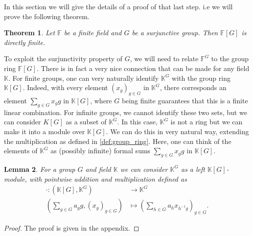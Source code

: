 \documentclass[titlepage, a4paper]{article}
\newcommand{\F}{\mathbb{F}}
\newtheorem{theorem}{Theorem}[section]
\newtheorem{lemma}[theorem]{Lemma}
\theoremstyle{remark}
\newtheorem{remark}[theorem]{Remark}
\begin{document}
	In this section we will give the details of a proof of that last step. 
	i.e we will prove the following theorem. 
	\begin{theorem}\label{thm:gottschalk_kaplansky}
		Let $\F$ be a finite field and $G$ be a surjunctive group. Then $\F[G]$ is directly finite. 
	\end{theorem}
	To exploit the surjunctivity property of $G$, we will need to relate $\mathbb F^G$ to the group ring $\mathbb F[G]$. There is in fact a very nice connection that can be made for any field $\mathbb K$.
	For finite groups, one can very naturally identify $\mathbb K^G$ with the group ring $\mathbb K[G]$. Indeed, with every element $(x_g)_{g \in G}$ in $\mathbb K^G$, there corresponds an element $\sum_{g \in G} x_g g$ in $\mathbb K[G]$, where $G$ being finite guarantees that this is a finite linear combination. For infinite groups, we cannot identify these two sets, but we can consider $K[G]$ as a subset of $\mathbb K^G$. In this case, $\mathbb K^G$ is not a ring but we can make it into a module over $\mathbb K[G]$. We can do this in very natural way, extending the multiplication as defined in \cref{def:group_ring}. Here, one can think of the elements of $\mathbb K^G$ as (possibly infinite) formal sums $\sum_{g \in G} x_g g$ in $\mathbb K[G]$.

	\begin{lemma}
		For a group $G$ and field $\mathbb K$ we can consider $\mathbb{K}^{G}$ as a left $\mathbb{K}[G]$-module, with pointwise addition and multiplication defined as
		\begin{align*}
			\cdot : (\mathbb{K}[G] , \mathbb{K}^{G}) &\longrightarrow \mathbb{K}^{G} \\
		\left( \sum_{g \in G} a_g g,  (x_g)_{g \in G}\right)  &\longmapsto \left( \sum_{h \in G} a_h x_{h^{-1}g} \right)_{g \in G}
	.\end{align*} 
	\end{lemma}
	\begin{proof}
		The proof is given in the appendix.
	\end{proof}
    
\end{document}
